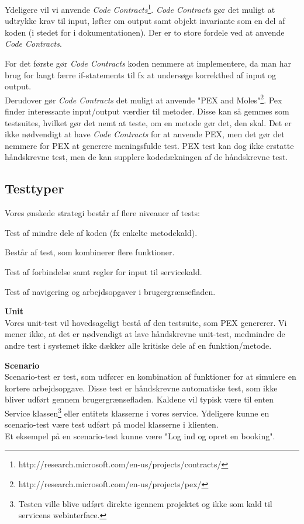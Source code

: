 Ydeligere vil vi anvende \textit{Code Contracts}\footnote{http://research.microsoft.com/en-us/projects/contracts/}. \textit{Code Contracts} gør det muligt at udtrykke krav til input, løfter om output samt objekt invariante som en del af koden (i stedet for i dokumentationen). Der er to store fordele ved at anvende \textit{Code Contracts}. 

For det første gør \textit{Code Contracts} koden nemmere at implementere, da man har brug for langt færre if-statements til fx at undersøge korrekthed af input og output.
\\Derudover gør \textit{Code Contracts} det muligt at anvende "PEX and Moles"\footnote{http://research.microsoft.com/en-us/projects/pex/}. Pex finder interessante input/output værdier til metoder. Disse kan så gemmes som testsuites, hvilket gør det nemt at teste, om en metode gør det, den skal. Det er ikke nødvendigt at have \textit{Code Contracts} for at anvende PEX, men det gør det nemmere for PEX at generere meningsfulde test. PEX test kan dog ikke erstatte håndskrevne test, men de kan supplere kodedækningen af de håndskrevne test.

\subsection*{Testtyper}
\label{Test_intendedStrat_types}
Vores ønskede strategi består af flere niveauer af tests:
\begin{my_description}
\item[Unit] Test af mindre dele af koden (fx enkelte metodekald).
\item[Scenario] Består af test, som kombinerer flere funktioner.
\item[Service] Test af forbindelse samt regler for input til servicekald.
\item[Brugergrænseflade] Test af navigering og arbejdsopgaver i brugergrænsefladen.
\end{my_description}

\textbf{Unit}
\\Vores unit-test vil hovedsageligt bestå af den testsuite, som PEX genererer. Vi mener ikke, at det er nødvendigt at lave håndskrevne unit-test, medmindre de andre test i systemet ikke dækker alle kritiske dele af en funktion/metode.

\textbf{Scenario}
\\Scenario-test er test, som udfører en kombination af funktioner for at simulere en kortere arbejdsopgave. Disse test er håndskrevne automatiske test, som ikke bliver udført gennem brugergrænsefladen. Kaldene vil typisk være til enten Service klassen\footnote{Testen ville blive udført direkte igennem projektet og ikke som kald til servicens webinterface.} eller entitets klasserne i vores service. Ydeligere kunne en scenario-test være test udført på model klasserne i klienten. 
\\Et eksempel på en scenario-test kunne være "Log ind og opret en booking".

